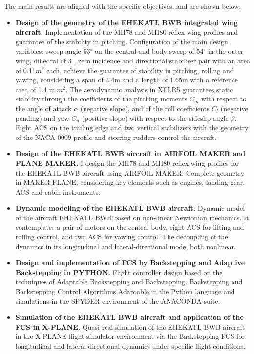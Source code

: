 The main results are aligned with the specific objectives, and are shown below: 
\begin{itemize}
    \item[R1] \textbf{Design of the geometry of the EHEKATL BWB integrated wing aircraft.} Implementation of the MH78 and MH80 réflex wing profiles and guarantee of the stability in pitching. Configuration of the main design variables: sweep angle 63$^\circ$ on the central and body sweep of 54$^\circ$ in the outer wing, dihedral of 3$^\circ$, zero incidence and directional stabiliser pair with an area of 0.11$m^2$ each, achieve the guarantee of stability in pitching, rolling and yawing, considering a span of 2.4m and a length of 1.65m with a reference area of 1.4 m.$m^2$. The aerodynamic analysis in XFLR5 guarantees static stability through the coefficients of the pitching moments $C_m$ with respect to the angle of attack $\alpha$ (negative slope), and of the roll coefficients $C_l$ (negative pending) and yaw $C_n$ (positive slope) with respect to the sideslip angle $\beta$. Eight ACS on the trailing edge and two vertical stabilizers with the geometry of the NACA 0009 profile and steering rudders control the aircraft.
    \item[R2] \textbf{Design of the EHEKATL BWB aircraft in AIRFOIL MAKER and PLANE MAKER.} I design the MH78 and MH80 reflex wing profiles for the EHEKATL BWB aircraft using AIRFOIL MAKER. Complete geometry in MAKER PLANE, considering key elements such as engines, landing gear, ACS and cabin instruments.
    \item[R3] \textbf{Dynamic modeling of the EHEKATL BWB aircraft.} Dynamic model of the aircraft EHEKATL BWB based on non-linear Newtonian mechanics. It contemplates a pair of motors on the central body, eight ACS for lifting and rolling control, and two ACS for yawing control. The decoupling of the dynamics in its longitudinal and lateral-directional mode, both nonlinear.
    \item[R4] \textbf{Design and implementation of FCS by Backstepping and Adaptive Backstepping in PYTHON.} Flight controller design based on the techniques of Adaptable Backstepping and Backstepping. Backstepping and Backstepping Control Algorithms Adaptable in the Python language and simulations in the SPYDER environment of the ANACONDA suite. 
    \item[R5] \textbf{Simulation of the EHEKATL BWB aircraft and application of the FCS in X-PLANE.} Quasi-real simulation of the EHEKATL BWB aircraft in the X-PLANE flight simulator environment via the Backstepping FCS for longitudinal and lateral-directional dynamics under specific flight conditions. 
\end{itemize}

